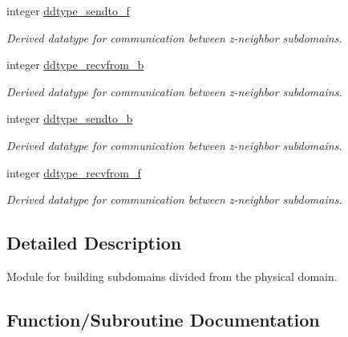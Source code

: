 \textbf{ }\par
\begin{DoxyCompactItemize}
\item 
integer \mbox{\hyperlink{namespacempi__subdomain_a4f3d66535b947c7afee75e6e73a47206}{ddtype\+\_\+sendto\+\_\+f}}
\begin{DoxyCompactList}\small\item\em Derived datatype for communication between z-\/neighbor subdomains. \end{DoxyCompactList}\item 
integer \mbox{\hyperlink{namespacempi__subdomain_ad6462f18c8c68c076005957e9d062252}{ddtype\+\_\+recvfrom\+\_\+b}}
\begin{DoxyCompactList}\small\item\em Derived datatype for communication between z-\/neighbor subdomains. \end{DoxyCompactList}\item 
integer \mbox{\hyperlink{namespacempi__subdomain_a7a2af0322a7aaa435951a5432859687a}{ddtype\+\_\+sendto\+\_\+b}}
\begin{DoxyCompactList}\small\item\em Derived datatype for communication between z-\/neighbor subdomains. \end{DoxyCompactList}\item 
integer \mbox{\hyperlink{namespacempi__subdomain_a4da19838e8bc3934ad5c24db424bec2c}{ddtype\+\_\+recvfrom\+\_\+f}}
\begin{DoxyCompactList}\small\item\em Derived datatype for communication between z-\/neighbor subdomains. \end{DoxyCompactList}\end{DoxyCompactItemize}



\subsection{Detailed Description}
Module for building subdomains divided from the physical domain. 

\subsection{Function/\+Subroutine Documentation}
\mbox{\label{namespacempi__subdomain_a55659431068678c08d21847338390ea8}} 
